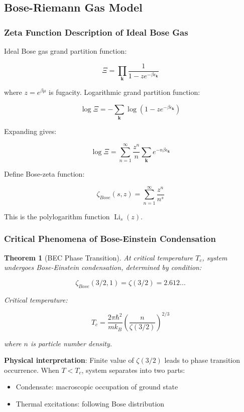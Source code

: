 \documentclass[12pt,a4paper]{article}
\newtheorem{theorem}{Theorem}[section]
\DeclareMathOperator{\Li}{Li}
\begin{document}
\subsection{Bose-Riemann Gas Model}

\subsubsection{Zeta Function Description of Ideal Bose Gas}

Ideal Bose gas grand partition function:

$$\Xi = \prod_{\mathbf{k}} \frac{1}{1 - ze^{-\beta\epsilon_{\mathbf{k}}}}$$

where $z = e^{\beta\mu}$ is fugacity. Logarithmic grand partition function:

$$\log \Xi = -\sum_{\mathbf{k}} \log(1 - ze^{-\beta\epsilon_{\mathbf{k}}})$$

Expanding gives:

$$\log \Xi = \sum_{n=1}^{\infty} \frac{z^n}{n} \sum_{\mathbf{k}} e^{-n\beta\epsilon_{\mathbf{k}}}$$

Define Bose-zeta function:

$$\zeta_{Bose}(s, z) = \sum_{n=1}^{\infty} \frac{z^n}{n^s}$$

This is the polylogarithm function $\Li_s(z)$.

\subsubsection{Critical Phenomena of Bose-Einstein Condensation}

\begin{theorem}[BEC Phase Transition]
At critical temperature $T_c$, system undergoes Bose-Einstein condensation, determined by condition:

$$\zeta_{Bose}(3/2, 1) = \zeta(3/2) = 2.612...$$

Critical temperature:

$$T_c = \frac{2\pi\hbar^2}{mk_B} \left(\frac{n}{\zeta(3/2)}\right)^{2/3}$$

where $n$ is particle number density.
\end{theorem}

\textbf{Physical interpretation}: Finite value of $\zeta(3/2)$ leads to phase transition occurrence. When $T < T_c$, system separates into two parts:
\begin{itemize}
\item Condensate: macroscopic occupation of ground state
\item Thermal excitations: following Bose distribution
\end{itemize}
\end{document}
